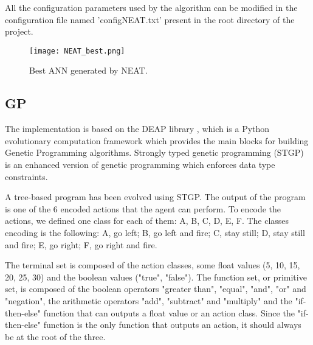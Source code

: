All the configuration parameters used by the algorithm can be modified in the configuration
file named 'configNEAT.txt' present in the root directory of the project.



\begin{figure*}[htbp]
\centerline{\texttt{[image: NEAT\_best.png]}}
\caption{Best ANN generated by NEAT.}
\label{fig:NEAT_best}
\end{figure*}

\subsection{GP}
The implementation is based on the DEAP library \cite{DEAP}, which is a Python evolutionary
computation framework which provides the main blocks for building Genetic Programming
algorithms. Strongly typed genetic programming (STGP) is an enhanced version of genetic
programming which enforces data type constraints.

A tree-based program has been evolved using STGP. The output of the program is one of
the 6 encoded actions that the agent can perform. To encode the actions, we defined one
class for each of them: A, B, C, D, E, F. The classes encoding is the following:
A, go left; B, go left and fire; C, stay still; D, stay still and fire; E, go right; F, go right and fire.

The terminal set is composed of the action classes, some float values (5, 10, 15, 20, 25, 30)
and the boolean values ("true", "false"). The function set, or primitive set, is composed of the
boolean operators "greater than", "equal", "and", "or" and "negation", the arithmetic operators
"add", "subtract" and "multiply" and the "if-then-else" function that can outputs a float value or
an action class. Since the "if-then-else" function is the only function that outputs an action, it
should always be at the root of the three.

